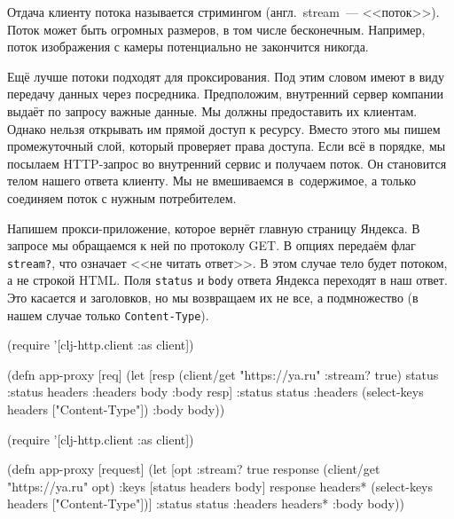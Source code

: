 Отдача клиенту потока называется стримингом (англ.~stream~--- <<поток>>). Поток
может быть огромных размеров, в том числе бесконечным. Например, поток
изображения с камеры потенциально не закончится никогда.

Ещё лучше потоки подходят для проксирования. Под этим словом имеют в виду
передачу данных через посредника. Предположим, внутренний сервер компании выдаёт
по запросу важные данные. Мы должны предоставить их клиентам. Однако нельзя
открывать им прямой доступ к ресурсу. Вместо этого мы пишем промежуточный слой,
который проверяет права доступа. Если всё в порядке, мы посылаем HTTP-запрос во
внутренний сервис и получаем поток. Он становится телом нашего ответа
клиенту. Мы не вмешиваемся в~содержимое, а только соединяем поток с нужным
потребителем.

Напишем прокси-приложение, которое вернёт главную страницу Яндекса. В запросе мы
обращаемся к ней по протоколу GET. В опциях передаём флаг \verb|stream?|, что
означает <<не читать ответ>>. В этом случае тело будет потоком, а не строкой
HTML. Поля \verb|status| и \verb|body| ответа Яндекса переходят в наш ответ. Это
касается и заголовков, но мы возвращаем их не все, а подмножество (в нашем
случае только \verb|Content-Type|).

\ifnarrow

\begin{english}
  \begin{clojure}
(require '[clj-http.client :as client])

(defn app-proxy [req]
  (let [resp (client/get "https://ya.ru"
                         {:stream? true})
        {status :status
         headers :headers
         body :body} resp]
    {:status status
     :headers (select-keys
                headers ["Content-Type"])
     :body body}))
  \end{clojure}
\end{english}

\else

\begin{english}
  \begin{clojure}
(require '[clj-http.client :as client])

(defn app-proxy [request]
  (let [opt {:stream? true}
        response (client/get "https://ya.ru" opt)
        {:keys [status headers body]} response
        headers* (select-keys headers ["Content-Type"])]
    {:status status
     :headers headers*
     :body body}))
  \end{clojure}
\end{english}

